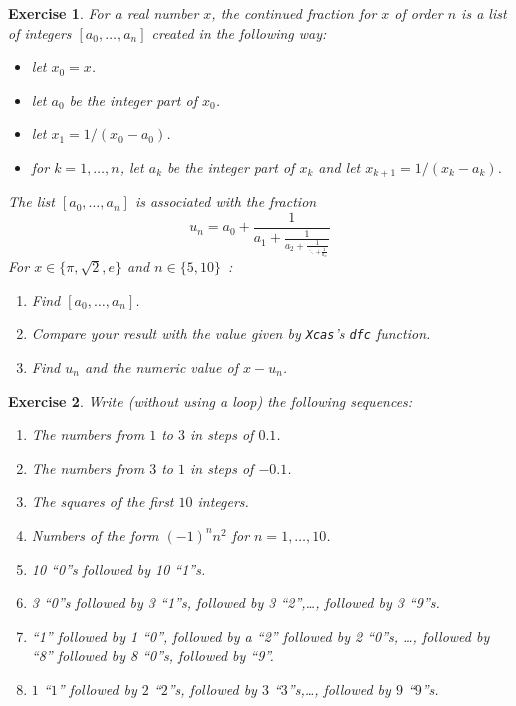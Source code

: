 \documentclass{article}
\newtheorem{exo}{Exercise}[section]
\begin{document}
\begin{exo}{\rm
For a real number $x$, the continued fraction for $x$ of order $n$ is
a list of integers $[a_0,\ldots,a_n]$ created in the following way:
\begin{itemize}
  \item
  let $x_0 = x$.
  \item  
  let $a_0$ be the integer part of $x_0$.
  \item 
  let $x_1 = 1/(x_0-a_0)$.
   \item
   for $k=1,\dots,n$, let $a_k$ be the integer part of $x_k$ and let
   $x_{k+1} = 1/(x_k - a_k)$.
\end{itemize}
The list $[a_0,\ldots,a_n]$ is associated with the fraction
\[
u_n = a_0+\frac{1}{\displaystyle{a_1+
\frac{1}{\displaystyle{a_2+\frac{1}{\ddots+\displaystyle{\frac{1}{a_n}}}}}}}
\]
For $x\in\{\pi,\sqrt{2}, e\}$ and $n\in \{5,10\}$~:
\begin{enumerate}
\item
Find $[a_0,\ldots,a_n]$.
\item
Compare your result with the value given by \texttt{Xcas}'s \texttt{dfc}
function.
\item
Find $u_n$ and the numeric value of $x-u_n$.
\end{enumerate}
}\end{exo}

\begin{exo}{\rm
Write (without using a loop) the following sequences:
\begin{enumerate}
\item
The numbers from $1$ to $3$ in steps of $0.1$.
\item
The numbers from $3$ to $1$ in steps of $-0.1$.
\item
The squares of the first $10$ integers.
\item
Numbers of the form $(-1)^n n^2$ for $n=1,\ldots,10$.
\item 
10 ``0''s followed by 10 ``1''s.
\item 
3 ``0''s followed by 3 ``1''s, followed by 3 ``2'',\ldots , 
followed by 3 ``9''s. 
\item
``1'' followed by 1 ``0'', followed by a ``2'' followed by 2 ``0''s,
\ldots, followed by ``8'' followed by 8 ``0''s, followed by ``9''.
\item
$1$ ``$1$'' followed by $2$ ``$2$''s, followed by $3$ ``$3$''s,\ldots ,
followed by $9$ ``$9$''s.
\end{enumerate} 
}\end{exo}
\end{document}

